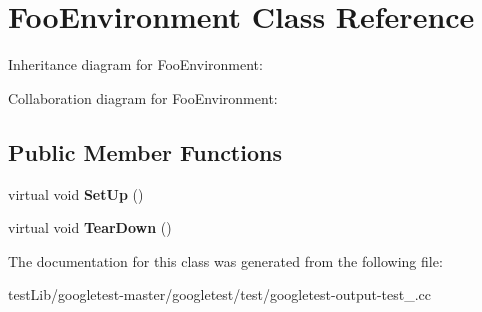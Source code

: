 \hypertarget{classFooEnvironment}{}\section{Foo\+Environment Class Reference}
\label{classFooEnvironment}


Inheritance diagram for Foo\+Environment\+:


Collaboration diagram for Foo\+Environment\+:
\subsection*{Public Member Functions}
\begin{DoxyCompactItemize}
\item 
\mbox{\label{classFooEnvironment_a7db8d8b312805aff437ae8534132a56d}} 
virtual void {\bfseries Set\+Up} ()
\item 
\mbox{\label{classFooEnvironment_a99a2c9df52106cce9e7a4bdda53df802}} 
virtual void {\bfseries Tear\+Down} ()
\end{DoxyCompactItemize}


The documentation for this class was generated from the following file\+:\begin{DoxyCompactItemize}
\item 
test\+Lib/googletest-\/master/googletest/test/googletest-\/output-\/test\+\_\+.\+cc\end{DoxyCompactItemize}
